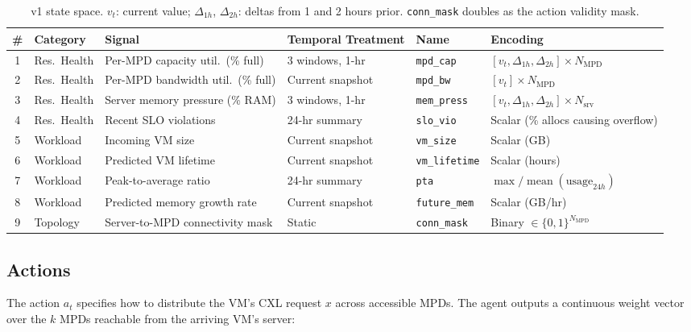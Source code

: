 \documentclass[11pt]{article}
\begin{document}
\begin{table}[H]
\centering
\small
\renewcommand{\arraystretch}{1.3}
\setlength{\tabcolsep}{4pt}
\begin{tabular}{clp{3.8cm}p{3.2cm}lp{4.2cm}}
\toprule
\textbf{\#} & \textbf{Category} & \textbf{Signal} & \textbf{Temporal Treatment} & \textbf{Name} & \textbf{Encoding} \\
\midrule
1 & Res.\ Health & Per-MPD capacity util.\ (\% full)
  & 3 windows, 1-hr & \texttt{mpd\_cap}
  & $[v_t,\Delta_{1h},\Delta_{2h}]\times N_\text{MPD}$ \\
2 & Res.\ Health & Per-MPD bandwidth util.\ (\% full)
  & Current snapshot & \texttt{mpd\_bw}
  & $[v_t]\times N_\text{MPD}$ \\
3 & Res.\ Health & Server memory pressure (\% RAM)
  & 3 windows, 1-hr & \texttt{mem\_press}
  & $[v_t,\Delta_{1h},\Delta_{2h}]\times N_\text{srv}$ \\
4 & Res.\ Health & Recent SLO violations
  & 24-hr summary & \texttt{slo\_vio}
  & Scalar (\% allocs causing overflow) \\
5 & Workload & Incoming VM size
  & Current snapshot & \texttt{vm\_size}
  & Scalar (GB) \\
6 & Workload & Predicted VM lifetime
  & Current snapshot & \texttt{vm\_lifetime}
  & Scalar (hours) \\
7 & Workload & Peak-to-average ratio
  & 24-hr summary & \texttt{pta}
  & $\max/\operatorname{mean}(\text{usage}_{24h})$ \\
8 & Workload & Predicted memory growth rate
  & Current snapshot & \texttt{future\_mem}
  & Scalar (GB/hr) \\
9 & Topology & Server-to-MPD connectivity mask
  & Static & \texttt{conn\_mask}
  & Binary $\in \{0,1\}^{N_\text{MPD}}$ \\
\bottomrule
\end{tabular}
\caption{v1 state space. $v_t$: current value; $\Delta_{1h}$, $\Delta_{2h}$:
deltas from 1 and 2 hours prior. \texttt{conn\_mask} doubles as the action
validity mask.}
\label{tab:states}
\end{table}

\subsection{Actions}
\label{sec:actions}

The action $a_t$ specifies how to distribute the VM's CXL request $x$ across
accessible MPDs. The agent outputs a continuous weight vector over the $k$
MPDs reachable from the arriving VM's server:
\end{document}
